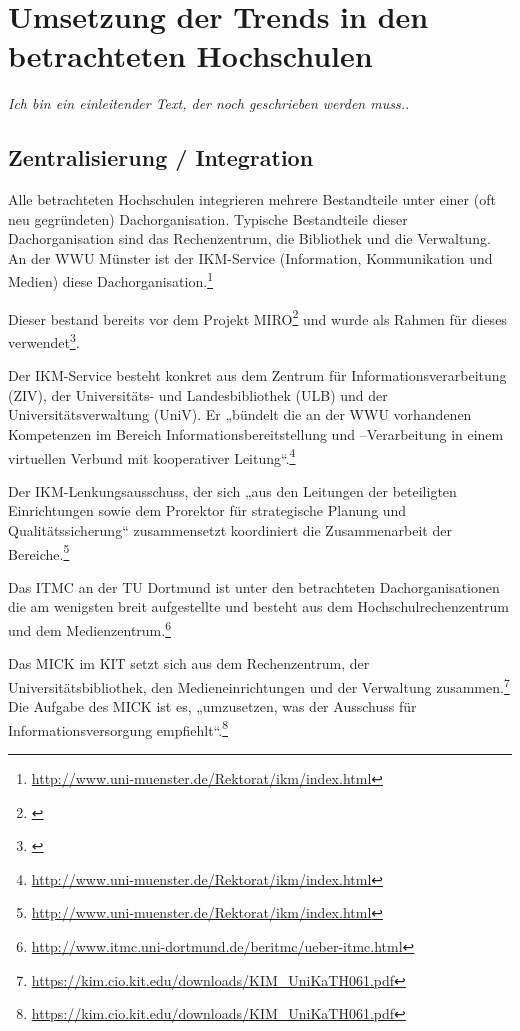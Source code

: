 \section{Umsetzung der Trends in den betrachteten Hochschulen}

\emph{Ich bin ein einleitender Text, der noch geschrieben werden muss..}

\subsection{Zentralisierung / Integration}
Alle betrachteten Hochschulen integrieren mehrere Bestandteile unter einer (oft neu gegründeten) Dachorganisation. Typische Bestandteile dieser Dachorganisation sind das Rechenzentrum, die Bibliothek und die Verwaltung.
An der WWU Münster ist der IKM-Service (Information, Kommunikation und Medien) diese Dachorganisation.\footnote{\url{http://www.uni-muenster.de/Rektorat/ikm/index.html}}

Dieser bestand bereits vor dem Projekt MIRO\footnote{\cite[8]{vogl_bericht_2013}} und wurde als Rahmen für dieses verwendet\footnote{\cite[47]{bode_informationsmanagement_2010}}.

Der IKM-Service besteht konkret aus dem Zentrum für Informationsverarbeitung (ZIV), der Universitäts- und Landesbibliothek (ULB) und der Universitätsverwaltung (UniV). Er „bündelt die an der WWU vorhandenen Kompetenzen im Bereich Informationsbereitstellung und –Verarbeitung in einem virtuellen Verbund mit kooperativer Leitung“.\footnote{\url{http://www.uni-muenster.de/Rektorat/ikm/index.html}}

Der IKM-Lenkungsausschuss, der sich „aus den Leitungen der beteiligten Einrichtungen sowie dem Prorektor für strategische Planung und Qualitätssicherung“ zusammensetzt koordiniert die Zusammenarbeit der Bereiche.\footnote{\url{http://www.uni-muenster.de/Rektorat/ikm/index.html}}

Das ITMC an der TU Dortmund ist unter den betrachteten Dachorganisationen die am wenigsten breit aufgestellte und besteht aus dem Hochschulrechenzentrum und dem Medienzentrum.\footnote{\url{http://www.itmc.uni-dortmund.de/beritmc/ueber-itmc.html}}

Das MICK im KIT setzt sich aus dem Rechenzentrum, der Universitätsbibliothek, den Medieneinrichtungen und der Verwaltung zusammen.\footnote{\url{https://kim.cio.kit.edu/downloads/KIM_UniKaTH061.pdf}} Die Aufgabe des MICK ist es, „umzusetzen, was der Ausschuss für Informationsversorgung empfiehlt“.\footnote{\url{https://kim.cio.kit.edu/downloads/KIM_UniKaTH061.pdf}}

